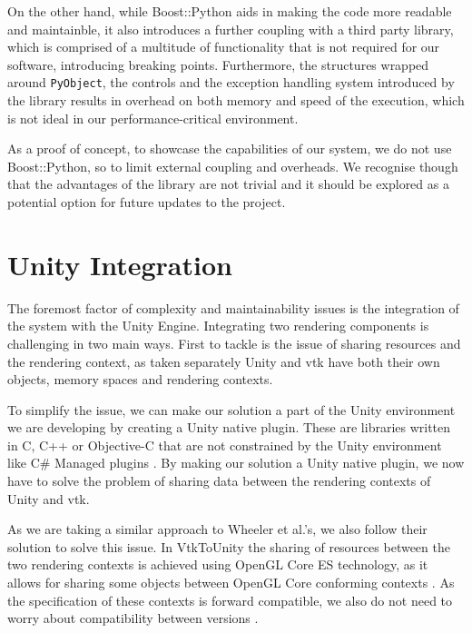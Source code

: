 On the other hand, while Boost::Python aids in making the code more readable and maintainble, it also introduces a further coupling with a third party library, which is comprised of a multitude of functionality that is not required for our software, introducing breaking points. Furthermore, the structures wrapped around \verb|PyObject|, the controls and the exception handling system introduced by the library results in overhead on both memory and speed of the execution, which is not ideal in our performance-critical environment. 

As a proof of concept, to showcase the capabilities of our system, we do not use Boost::Python, so to limit external coupling and overheads. We recognise though that the advantages of the library are not trivial and it should be explored as a potential option for future updates to the project.

\section{Unity Integration}

The foremost factor of complexity and maintainability issues is the integration of the system with the Unity Engine. Integrating two rendering components is challenging in two main ways. First to tackle is the issue of sharing resources and the rendering context, as taken separately Unity and \acrshort{vtk} have both their own objects, memory spaces and rendering contexts.

To simplify the issue, we can make our solution a part of the Unity environment we are developing by creating a Unity native plugin. These are libraries written in C, C++ or Objective-C that are not constrained by the Unity environment like C\# Managed plugins \cite{technologies_21AD}. By making our solution a Unity native plugin, we now have to solve the problem of sharing data between the rendering contexts of Unity and \acrshort{vtk}.

As we are taking a similar approach to Wheeler et al.'s, we also follow their solution to solve this issue. In VtkToUnity the sharing of resources between the two rendering contexts is achieved using OpenGL Core ES technology, as it allows for sharing some objects between OpenGL Core conforming contexts \cite{wheeler_virtual_2018}. As the specification of these contexts is forward compatible, we also do not need to worry about compatibility between versions \cite{khronos_opengl_2021}.

